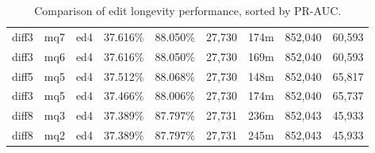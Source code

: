 \begin{sidewaystable}[!ph]
\begin{center}
\begin{tabular}{|c|c|c||c|c||c|c|c|c|}
diff3 & mq7 & ed4 & 37.616\% & 88.050\% & 27,730 & 174m & 852,040 & 60,593 \\
diff3 & mq6 & ed4 & 37.616\% & 88.050\% & 27,730 & 169m & 852,040 & 60,593 \\
diff5 & mq5 & ed4 & 37.512\% & 88.068\% & 27,730 & 148m & 852,040 & 65,817 \\
diff3 & mq5 & ed4 & 37.466\% & 88.006\% & 27,730 & 174m & 852,040 & 65,737 \\
diff8 & mq3 & ed4 & 37.389\% & 87.797\% & 27,731 & 236m & 852,043 & 45,933 \\
diff8 & mq2 & ed4 & 37.389\% & 87.797\% & 27,731 & 245m & 852,043 & 45,933 \\
\hline
\end{tabular}
\end{center}
\caption{Comparison of edit longevity performance,
    sorted by PR-AUC.}
\label{tab:editshoutJ}
\end{sidewaystable}
\clearpage
